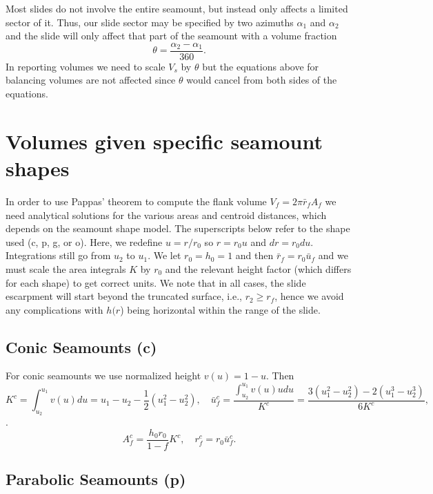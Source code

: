 \documentclass[12pt,letterpaper,margin=0.5in]{report}
\begin{document}
Most slides do not involve the entire seamount, but instead only affects a limited sector of it.  Thus, our slide sector may be specified by two
azimuths $\alpha_1$ and $\alpha_2$ and the slide will only affect that part of the seamount with a volume fraction
\begin{equation}
\theta = \frac{\alpha_2 - \alpha_1}{360}.
\end{equation}
In reporting volumes we need to scale $V_s$ by $\theta$ but the equations above for balancing volumes are not affected since $\theta$ would cancel from both sides of the equations.

\section{Volumes given specific seamount shapes}

In order to use Pappas' theorem to compute the flank volume $V_f = 2 \pi \bar{r}_f A_f$ we need analytical
solutions for the various areas and centroid distances, which depends on the seamount shape model.  The
superscripts below refer to the shape used (c, p, g, or o). Here,
we redefine $u = r/r_0$ so $r = r_0 u$ and $dr = r_0 du$.  Integrations still go from $u_2$
to $u_1$.  We let $r_0 = h_0 = 1$ and then $\bar{r}_f = r_0 \bar{u}_f$ and we must scale the area integrals $K$
by $r_0$ and the relevant height factor (which differs for each shape) to get correct units. We note that
in all cases, the slide escarpment will start beyond the truncated surface, i.e., $r_2 \ge r_f$, hence we avoid
any complications with $h(r$) being horizontal within the range of the slide.

\subsection{Conic Seamounts (c)}

For conic seamounts we use normalized height $v(u) = 1 - u$. Then
\begin{equation}
K^c = \int_{u_2}^{u_1} v(u) du = u_1 - u_2 - \frac{1}{2}\left ( u_1^2 - u_2^2 \right ), \quad \bar{u}_f^c = \frac{\int_{u_2}^{u_1} v(u) u du}{K^c} = \frac{3(u_1^2 - u_2^2) - 2 (u_1^3 - u_2^3)}{6K^c},
\end{equation}.
\begin{equation}
A_f^c = \frac{h_0 r_0}{1-f}K^c, \quad r_f^c = r_0\bar{u}_f^c.
\end{equation}

\subsection{Parabolic Seamounts (p)}
\end{document}
